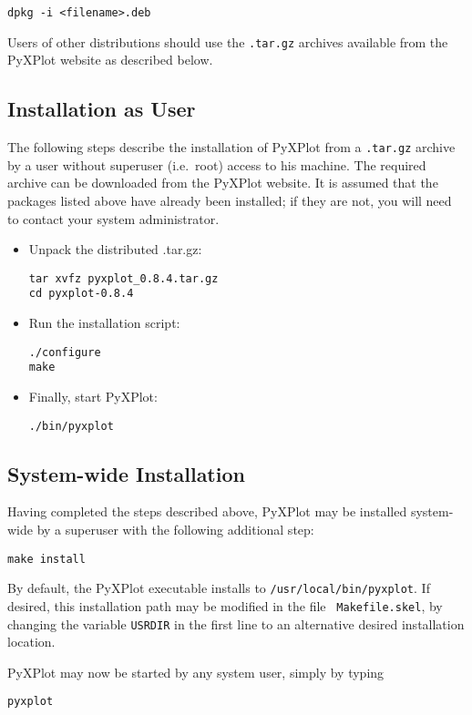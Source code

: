 \begin{verbatim}
dpkg -i <filename>.deb
\end{verbatim}

Users of other distributions should use the {\tt .tar.gz} archives available
from the PyXPlot website as described below.

\subsection{Installation as User}

The following steps describe the installation of PyXPlot from a {\tt .tar.gz}
archive by a user without superuser (i.e.\ root) access to his machine. The
required archive can be downloaded from the PyXPlot website. It is assumed that
the packages listed above have already been installed; if they are not, you
will need to contact your system administrator.

\begin{itemize}
\item Unpack the distributed .tar.gz:

\begin{verbatim}
tar xvfz pyxplot_0.8.4.tar.gz
cd pyxplot-0.8.4
\end{verbatim}

\item Run the installation script:

\begin{verbatim}
./configure
make
\end{verbatim}

\item Finally, start PyXPlot:

\begin{verbatim}
./bin/pyxplot
\end{verbatim}

\end{itemize}

\subsection{System-wide Installation}

Having completed the steps described above, PyXPlot may be installed
system-wide by a superuser with the following additional
step:

\begin{verbatim}
make install
\end{verbatim}

By default, the PyXPlot executable installs to {\tt /usr/local/bin/pyxplot}.
If desired, this installation path may be modified in the file {\tt
Makefile.skel}, by changing the variable {\tt USRDIR} in the first line to an
alternative desired installation location.

PyXPlot may now be started by any system user, simply by typing

\begin{verbatim}
pyxplot
\end{verbatim}


